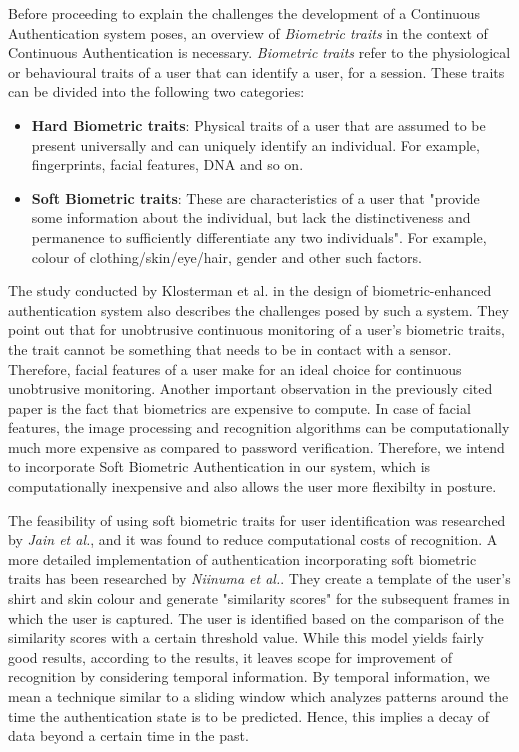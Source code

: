 \documentclass[%
        final,
        notitlepage,
        narroweqnarray,
        inline,
        ]{ieee}
\begin{document}
Before proceeding to explain the challenges the development of a Continuous Authentication system poses, an overview of \emph{Biometric traits} in the context of Continuous Authentication is necessary.
\emph{Biometric traits} refer to the physiological or behavioural traits of a user that can identify a user, for a session.
These traits can be divided into the following two categories:
\begin{itemize}
	\item {\bf Hard Biometric traits}: Physical traits of a user that are assumed to be present universally and can uniquely identify an individual. For example, fingerprints, facial features, DNA and so on.
	\item {\bf Soft Biometric traits}: These are characteristics of a user that "provide some information about the individual, but lack the distinctiveness and permanence to sufficiently differentiate any two individuals"\cite{Jain204}. For example, colour of clothing/skin/eye/hair, gender and other such factors.

\end{itemize}

The study conducted by Klosterman et al.\cite{Klos00} in the design of biometric-enhanced authentication system also describes the challenges posed by such a system.
They point out that for unobtrusive continuous monitoring of a user's biometric traits, the trait cannot be something that needs to be in contact with a sensor.
Therefore, facial features of a user make for an ideal choice for continuous unobtrusive monitoring.
Another important observation in the previously cited paper is the fact that biometrics are expensive to compute.
In case of facial features, the image processing and recognition algorithms can be computationally much more expensive as compared to password verification.
Therefore, we intend to incorporate Soft Biometric Authentication in our system, which is computationally inexpensive and also allows the user more flexibilty in posture. 

The feasibility of using soft biometric traits for user identification was researched by \emph{Jain et al.}\cite{Jain204}, and it was found to reduce computational costs of recognition.
A more detailed implementation of authentication incorporating soft biometric traits has been researched by \emph{Niinuma et al.}\cite{Niin10}.
They create a template of the user's shirt and skin colour and generate "similarity scores" for the subsequent frames in which the user is captured.
The user is identified based on the comparison of the similarity scores with a certain threshold value.
While this model yields fairly good results, according to the results, it leaves scope for improvement of recognition by considering temporal information.
By temporal information, we mean a technique similar to a sliding window which analyzes patterns around the time the authentication state is to be predicted.
Hence, this implies a decay of data beyond a certain time in the past.
\end{document}
